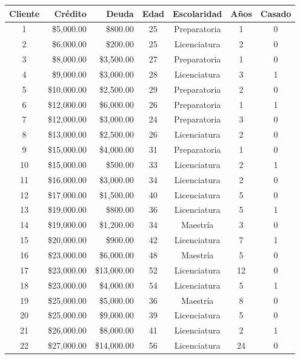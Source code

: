 \documentclass{article}
\begin{document}
\begin{table}[h!]
    \centering
    \begin{tabular}{|c|r|r|c|c|c|c|}
        \hline
        Cliente & Crédito & Deuda & Edad & Escolaridad & Años & Casado \\
        \hline
        1  & \$5,000.00  & \$800.00  & 25 & Preparatoria & 1  & 0 \\
        2  & \$6,000.00  & \$200.00  & 25 & Licenciatura & 2  & 0 \\
        3  & \$8,000.00  & \$3,500.00 & 27 & Preparatoria & 1  & 0 \\
        4  & \$9,000.00  & \$3,000.00 & 28 & Licenciatura & 3  & 1 \\
        5  & \$10,000.00 & \$2,500.00 & 29 & Preparatoria & 2  & 0 \\
        6  & \$12,000.00 & \$6,000.00 & 26 & Preparatoria & 1  & 1 \\
        7  & \$12,000.00 & \$3,000.00 & 24 & Preparatoria & 3  & 0 \\
        8  & \$13,000.00 & \$2,500.00 & 26 & Licenciatura & 2  & 0 \\
        9  & \$15,000.00 & \$4,000.00 & 31 & Preparatoria & 1  & 0 \\
        10 & \$15,000.00 & \$500.00  & 33 & Licenciatura & 2  & 1 \\
        11 & \$16,000.00 & \$3,000.00 & 34 & Licenciatura & 2  & 0 \\
        12 & \$17,000.00 & \$1,500.00 & 40 & Licenciatura & 5  & 0 \\
        13 & \$19,000.00 & \$800.00  & 36 & Licenciatura & 5  & 1 \\
        14 & \$19,000.00 & \$1,200.00 & 34 & Maestría    & 3  & 0 \\
        15 & \$20,000.00 & \$900.00  & 42 & Licenciatura & 7  & 1 \\
        16 & \$23,000.00 & \$6,000.00 & 48 & Maestría    & 5  & 0 \\
        17 & \$23,000.00 & \$13,000.00 & 52 & Licenciatura & 12 & 0 \\
        18 & \$23,000.00 & \$4,000.00 & 54 & Licenciatura & 5  & 1 \\
        19 & \$25,000.00 & \$5,000.00 & 36 & Maestría    & 8  & 0 \\
        20 & \$25,000.00 & \$9,000.00 & 39 & Licenciatura & 5  & 0 \\
        21 & \$26,000.00 & \$8,000.00 & 41 & Licenciatura & 2  & 1 \\
        22 & \$27,000.00 & \$14,000.00 & 56 & Licenciatura & 24 & 0 \\

\end{tabular}
\end{table}
\end{document}
